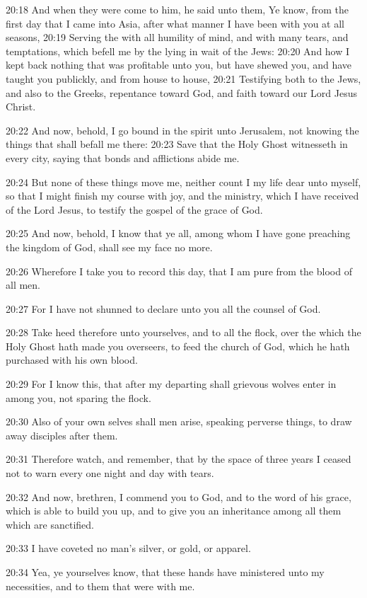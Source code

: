 20:18 And when they were come to him, he said unto them, Ye know, from
the first day that I came into Asia, after what manner I have been
with you at all seasons, 20:19 Serving the \LORD with all humility of
mind, and with many tears, and temptations, which befell me by the
lying in wait of the Jews: 20:20 And how I kept back nothing that was
profitable unto you, but have shewed you, and have taught you
publickly, and from house to house, 20:21 Testifying both to the Jews,
and also to the Greeks, repentance toward God, and faith toward our
Lord Jesus Christ.

20:22 And now, behold, I go bound in the spirit unto Jerusalem, not
knowing the things that shall befall me there: 20:23 Save that the
Holy Ghost witnesseth in every city, saying that bonds and afflictions
abide me.

20:24 But none of these things move me, neither count I my life dear
unto myself, so that I might finish my course with joy, and the
ministry, which I have received of the Lord Jesus, to testify the
gospel of the grace of God.

20:25 And now, behold, I know that ye all, among whom I have gone
preaching the kingdom of God, shall see my face no more.

20:26 Wherefore I take you to record this day, that I am pure from the
blood of all men.

20:27 For I have not shunned to declare unto you all the counsel of
God.

20:28 Take heed therefore unto yourselves, and to all the flock, over
the which the Holy Ghost hath made you overseers, to feed the church
of God, which he hath purchased with his own blood.

20:29 For I know this, that after my departing shall grievous wolves
enter in among you, not sparing the flock.

20:30 Also of your own selves shall men arise, speaking perverse
things, to draw away disciples after them.

20:31 Therefore watch, and remember, that by the space of three years
I ceased not to warn every one night and day with tears.

20:32 And now, brethren, I commend you to God, and to the word of his
grace, which is able to build you up, and to give you an inheritance
among all them which are sanctified.

20:33 I have coveted no man's silver, or gold, or apparel.

20:34 Yea, ye yourselves know, that these hands have ministered unto
my necessities, and to them that were with me.

